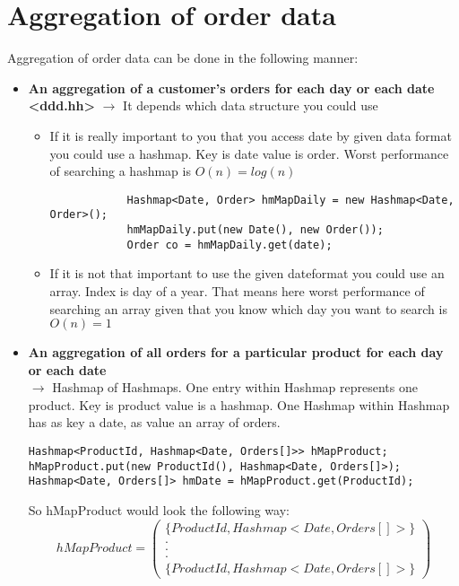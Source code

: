 \chapter*{Aggregation of order data}
Aggregation of order data can be done in the following manner:
\begin{itemize}
    \item \textbf{An aggregation of a customer’s orders for each day or each date <ddd.hh>} $\rightarrow$ It depends which data structure you could use
    \begin{itemize}
        \item If it is really important to you that you access date by given data format you could use a hashmap. Key is date value is order.
        Worst performance of searching a hashmap is $O(n) = log(n)$
        {\footnotesize \begin{lstlisting}
            Hashmap<Date, Order> hmMapDaily = new Hashmap<Date, Order>();
            hmMapDaily.put(new Date(), new Order());
            Order co = hmMapDaily.get(date);
        \end{lstlisting}}
        \item If it is not that important to use the given dateformat you could use an array. Index is day of a year. That means here worst performance of searching an array
        given that you know which day you want to search is $O(n) = 1$
    \end{itemize}


    \item \textbf{An aggregation of all orders for a particular product for each day or each date} \\ $\rightarrow$
    Hashmap of Hashmaps. One entry within Hashmap represents one product. Key is product value is a hashmap. One Hashmap within Hashmap has
    as key a date, as value an array of orders.
{\footnotesize \begin{lstlisting}
Hashmap<ProductId, Hashmap<Date, Orders[]>> hMapProduct;
hMapProduct.put(new ProductId(), Hashmap<Date, Orders[]>);
Hashmap<Date, Orders[]> hmDate = hMapProduct.get(ProductId);
\end{lstlisting}}
    So hMapProduct would look the following way:
    \[hMapProduct = \begin{pmatrix}
    \{ProductId, Hashmap<Date, Orders[]>\} \\
         . \\
         . \\
         . \\
    \{ProductId, Hashmap<Date, Orders[]>\}
    \end{pmatrix}\]
\end{itemize}

